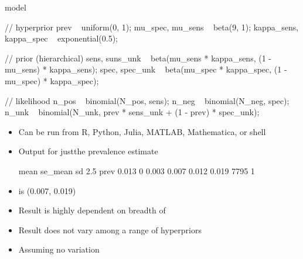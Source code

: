 \documentclass[10pt]{report}
\begin{document}
{\small
\begin{stancode}
model {
  // hyperprior
  prev ~ uniform(0, 1);
  mu_spec, mu_sens ~ beta(9, 1);
  kappa_sens, kappa_spec ~ exponential(0.5);

  // prior (hierarchical)
  sens, suns_unk ~ beta(mu_sens * kappa_sens, (1 - mu_sens) * kappa_sens);
  spec, spec_unk ~ beta(mu_spec * kappa_spec, (1 - mu_spec) * kappa_spec);

  // likelihood
  n_pos ~ binomial(N_pos, sens);
  n_neg ~ binomial(N_neg, spec);
  n_unk ~ binomial(N_unk, prev * sens_unk + (1 - prev) * spec_unk);
}
\end{stancode}

\begin{itemize}
\item Can be run from R, Python, Julia, MATLAB, Mathematica, or shell
\item[] Output for justthe prevalence estimate
{\small
\begin{stancode}
       mean  se_mean     sd   2.5%
prev  0.013        0  0.003  0.007  0.012  0.019   7795     1
\end{stancode}
}
\item {} is (0.007, 0.019)
\item Result is highly dependent on breadth of 
\item Result does not vary among a range of  hyperpriors
\item Assuming no variation 
\end{itemize}

}
\end{document}
